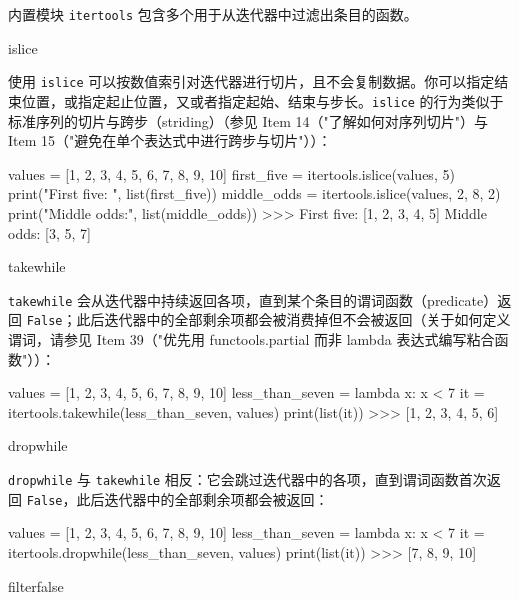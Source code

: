 内置模块 \texttt{itertools} 包含多个用于从迭代器中过滤出条目的函数。

\begin{codebox}[python]
islice
\end{codebox}

使用 \texttt{islice} 可以按数值索引对迭代器进行切片，且不会复制数据。你可以指定结束位置，或指定起止位置，又或者指定起始、结束与步长。\texttt{islice} 的行为类似于标准序列的切片与跨步（striding）（参见 Item 14（"了解如何对序列切片"）与 Item 15（"避免在单个表达式中进行跨步与切片"））：

\begin{codebox}[python]
values = [1, 2, 3, 4, 5, 6, 7, 8, 9, 10]
first_five = itertools.islice(values, 5)
print("First five: ", list(first_five))
middle_odds = itertools.islice(values, 2, 8, 2)
print("Middle odds:", list(middle_odds))
>>>
First five:  [1, 2, 3, 4, 5]
Middle odds: [3, 5, 7]
\end{codebox}

\begin{codebox}[python]
takewhile
\end{codebox}

\texttt{takewhile} 会从迭代器中持续返回各项，直到某个条目的谓词函数（predicate）返回 \texttt{False}；此后迭代器中的全部剩余项都会被消费掉但不会被返回（关于如何定义谓词，请参见 Item 39（"优先用 functools.partial 而非 lambda 表达式编写粘合函数"））：

\begin{codebox}[python]
values = [1, 2, 3, 4, 5, 6, 7, 8, 9, 10]
less_than_seven = lambda x: x < 7
it = itertools.takewhile(less_than_seven, values)
print(list(it))
>>>
[1, 2, 3, 4, 5, 6]
\end{codebox}

\begin{codebox}[python]
dropwhile
\end{codebox}

\texttt{dropwhile} 与 \texttt{takewhile} 相反：它会跳过迭代器中的各项，直到谓词函数首次返回 \texttt{False}，此后迭代器中的全部剩余项都会被返回：

\begin{codebox}[python]
values = [1, 2, 3, 4, 5, 6, 7, 8, 9, 10]
less_than_seven = lambda x: x < 7
it = itertools.dropwhile(less_than_seven, values)
print(list(it))
>>>
[7, 8, 9, 10]
\end{codebox}

\begin{codebox}[python]
filterfalse
\end{codebox}

